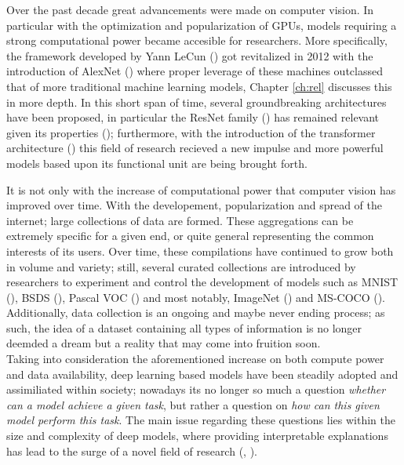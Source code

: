 Over the past decade great advancements were made on computer vision. In particular with the 
optimization and popularization of GPUs, models requiring a strong computational power became 
accesible for researchers. More specifically, the framework developed by Yann LeCun 
(\cite{lecun1998gradient}) got revitalized in 2012 with the introduction of AlexNet 
(\cite{krizhevsky2012imagenet}) where proper leverage of these machines outclassed that of 
more traditional machine learning models, Chapter \ref{ch:rel} discusses this in more depth. 
In this short span of time, several groundbreaking architectures have been proposed, in 
particular the ResNet family (\cite{he2016deep}) has remained relevant given its properties
(\cite{wightman2021resnet}); furthermore, with the introduction of the transformer architecture 
(\cite{vaswani2017attention}) this field of research recieved a new impulse and more powerful models 
based upon its functional unit are being brought forth. 

It is not only with the increase of computational power that computer vision has improved over time. 
With the developement, popularization and spread of the internet; large collections of data are 
formed. These aggregations can be extremely specific for a given end, or 
quite general representing the common interests of its users. Over time, these compilations have 
continued to grow both in volume and variety; still, several curated collections are introduced by 
researchers to experiment and control the development of models such as MNIST (\cite{lecun1998gradient}),
BSDS (\cite{MartinFTM01}), Pascal VOC (\cite{pascal-voc-2012}) and most notably, 
ImageNet (\cite{ILSVRC15}) and MS-COCO (\cite{lin2014microsoft}). Additionally, data collection is
an ongoing and maybe never ending process; as such, the idea of a dataset containing all types of 
information is no longer deemded a dream but a reality that may come into fruition soon.\\

Taking into consideration the aforementioned  increase on  both compute power and data 
availability, deep learning based models have been steadily adopted and assimiliated within society; 
nowadays its no longer so much a question \textit{whether can a model achieve a given task}, but 
rather a question on \textit{how can this given model perform this task}. The main issue regarding 
these questions lies within the size and complexity of deep models, where providing interpretable 
explanations has lead to the surge of a novel field of research (\cite{guidotti2018survey}, 
\cite{bodria2021benchmarking}).

